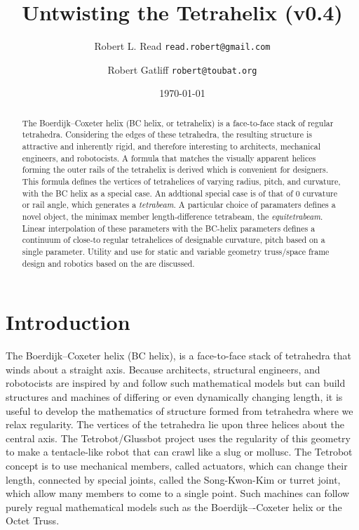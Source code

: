 \documentclass[11pt]{article}
\title{Untwisting the Tetrahelix (v0.4)}
\author{Robert L. Read \texttt{read.robert@gmail.com} \and
  Robert Gatliff \texttt{robert@toubat.org}
}
\date{\today}
\begin{document}
\maketitle


\begin{abstract}
  The Boerdijk--Coxeter helix (BC helix, or tetrahelix) is a face-to-face stack of regular tetrahedra.
  Considering the edges of these tetrahedra, the resulting structure is attractive and inherently rigid,
  and therefore interesting to architects, mechanical engineers,
  and robotocists.
  A formula that matches the visually apparent helices forming the outer rails of the tetrahelix is derived which
  is convenient for designers.
  This formula defines the vertices of tetrahelices of varying radius, pitch, and curvature, with the BC helix
  as a special case. 
  An addtional special case is of that of $0$ curvature or rail angle, which generates a \emph{tetrabeam}.
  A particular choice of paramaters defines a novel object, the  minimax member length-difference tetrabeam,
  the \emph{equitetrabeam}.
  Linear interpolation of these parameters with the BC-helix parameters defines a continuum of close-to regular
  tetrahelices of designable curvature, pitch based on a single parameter.
  Utility and use for static and variable geometry truss/space frame design and robotics based on the are discussed.
\end{abstract}


\section{Introduction}

The Boerdijk--Coxeter helix\cite{coxeter1985simplicial} (BC helix),
is a face-to-face stack of tetrahedra that winds about a straight axis.
Because architects, structural engineers, and robotocists are inspired by and follow such mathematical models but can build
structures and machines of differing or even dynamically changing length, it is useful to develop
the mathematics of structure formed from tetrahedra where we relax regularity.
The vertices of the tetrahedra
lie upon three
helices about the central axis.
The Tetrobot/Glussbot\cite{TetrobotBook} project
uses the regularity of this geometry to make a tentacle-like robot that can crawl like a slug or mollusc.
The Tetrobot concept
is to use mechanical members, called actuators, which can change their length, connected by special joints, called the Song-Kwon-Kim\cite{song2003spherical} or turret joint,
which allow many
members to come to a single point.
Such machines can follow purely regual mathematical models such as the Boerdijk–-Coxeter helix or the Octet Truss\cite{richard1961synergetic}.
\end{document}
